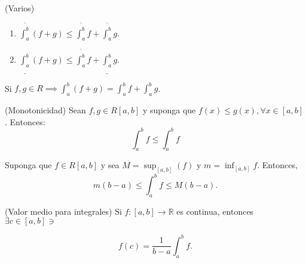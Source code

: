 \begin{prop}(Varios)
	\begin{enumerate}
		\item $\overline{\int_a^b}(f+g)\leq \overline{\int_a^b}f+\overline{\int_a^b}g$. 
		\item $\underline{\int_a^b}(f+g)\leq \overline{\int_a^b}f+\underline{\int_a^b}g$. 
	\end{enumerate}
\end{prop}

\begin{teorema}
	Si $f,g\in R\implies \int_a^b(f+g)=\int_a^b f+\int_a^b g$. 
\end{teorema}

\begin{prop}(Monotonicidad)
	Sean $f,g\in R[a,b]$ y suponga que $f(x)\leq g(x),\forall x\in [a,b]$. Entonces: 
	$$\int_a^b f\leq \int_a^b f$$
\end{prop}


\begin{teorema}
	Suponga que $f\in R[a,b]$ y sea $M=\sup_{[a,b]}(f)$ y $m=\inf_{[a,b]}f$. Entonces, 
	$$m(b-a)\leq \int_a^b f\leq M(b-a).$$
\end{teorema}


\begin{teorema}(Valor medio para integrales)
	Si $f:[a,b]\to\mathbb{R}$ es continua, entonces $\exists c\in [a,b]\ni$ 
	
	$$f(c)=\frac{1}{b-a}\int_a^b f.$$
\end{teorema}
